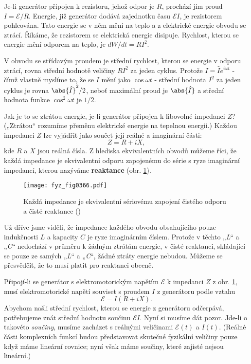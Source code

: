   Je-li generátor připojen k rezistoru, jehož odpor je \(R\), prochází jím proud 
  \(I=\mathscr{E}/R\). Energie, již generátor dodává zajednotku času \(\mathscr{E}I\), je 
  rezistorem pohlcována. Tato energie se v něm mění na teplo a z elektrické energie obvodu se 
  ztrácí. Říkáme, že rezistorem se elektrická energie disipuje. Rychlost, kterou se energie mění 
  odporem na teplo, je \(dW/dt = RI^2\).
  
  V obvodu se střídavým proudem je střední rychlost, kterou se energie v odporu ztrácí, rovna 
  střední hodnotě veličiny \(RI^2\) za jeden cyklus. Protože \(I= \hat{I}e^{i\omega t}\) - čímž 
  vlastně myslíme to, že se \(I\) mění jako \(\cos\omega t\) - střední hodnota \(I^2\) za jeden 
  cyklus je rovna \(\abs{\hat{I}}^2/2\), neboť maximální proud je \(\abs{\hat{I}}\) a střední 
  hodnota funkce \(\cos^2\omega t\) je \(1/2\).
  
  Jak je to se ztrátou energie, je-li generátor připojen k libovolné impedanci \(Z\)? („Ztrátou“ 
  rozumíme přeměnu elektrické energie na tepelnou energii.) Každou impedanci \(Z\) lze vyjádřit 
  jako součet její reálné a imaginární části:
  \begin{equation}\label{fyz:eq492}
    Z = R + iX,
  \end{equation}
  kde \(R\) a \(X\) jsou reálná čísla. Z hlediska ekvivalentních obvodů můžeme říci, že každá 
  impedance je ekvivalentní odporu zapojenému do série s ryze imaginární impedancí, kterou nazýváme 
  \textbf{reaktance} (obr. \ref{fyz:fig0366}).
  
  \begin{figure}[ht!] %
    \centering
    \texttt{[image: fyz\_fig0366.pdf]}
    \caption{Každá impedance je ekvivalentní sériovému zapojení čistého odporu a čisté reaktance
             (\cite[s.~406]{Feynman02})}
    \label{fyz:fig0366}
  \end{figure}
  
  Už dříve jsme viděli, že impedance každého obvodu obsahujícího pouze indukčnosti \(L\) a kapacity 
  \(C\) je ryze imaginárním číslem. Protože v těchto „\emph{L}“ a „\emph{C}“ nedochází v průměru k 
  žádným ztrátám energie, v čisté reaktanci, skládající se pouze ze samých „\emph{L}“ a „\emph{C}“, 
  žádné ztráty energie nebudou. Můžeme se přesvědčit, že to musí platit pro reaktanci obecně.
  
  Připojí-li se generátor s elektromotorickým napětím \(\mathscr{E}\) k impedanci \(Z\) z obr. 
  \ref{fyz:fig0366}, musí elektromotorické napětí souviset s proudem \(I\) z generátoru podle vztahu
  \begin{equation}\label{fyz:eq493}
    \mathscr{E} = I(R + iX). 
  \end{equation}
  Abychom našli střední rychlost, kterou se energie z generátoru odčerpává, potřebujeme znát 
  střední hodnotu součinu \(\mathscr{E}I\). Nyní si musíme dát pozor. Jde-li o takovéto 
  \emph{součiny}, musíme zacházet s reálnými veličinami \(\mathscr{E}(t)\) a \(I(t)\). (Reálné 
  části komplexních funkcí budou představovat skutečné fyzikální veličiny pouze když máme lineární 
  rovnice; nyní však máme součiny, které zajisté nejsou lineární.)
  
